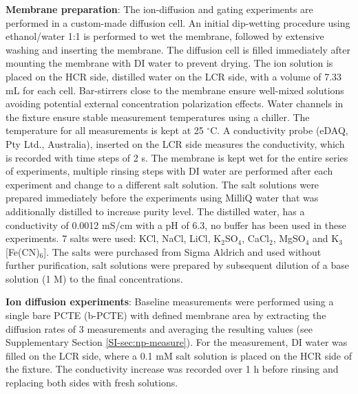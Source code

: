 \vspace{1em}
\noindent
\textbf{Membrane preparation}: The ion-diffusion and gating experiments are
performed in a custom-made diffusion cell. An initial dip-wetting
procedure using ethanol/water 1:1 is performed to wet the membrane,
followed by extensive washing and inserting the membrane. The
diffusion cell is filled immediately after mounting the membrane with
DI water to prevent drying. The ion solution is placed on the HCR
side, distilled water on the LCR side, with a volume of 7.33 mL for
each cell. Bar-stirrers close to the membrane ensure well-mixed
solutions avoiding potential external concentration polarization
effects. Water channels in the fixture ensure stable measurement
temperatures using a chiller. The temperature for all measurements is
kept at 25 $^{\circ}$C. A conductivity probe (eDAQ, Pty Ltd.,
Australia), inserted on the LCR side measures the conductivity, which
is recorded with time steps of 2 s. The membrane is kept wet for the
entire series of experiments, multiple rinsing steps with DI water are
performed after each experiment and change to a different salt
solution. The salt solutions were prepared immediately before the
experiments using MilliQ water that was additionally distilled to
increase purity level. The distilled water, has a conductivity of
0.0012 mS/cm with a pH of 6.3, no buffer has been used in these
experiments. 7 salts were used: KCl, NaCl, LiCl, K$_{2}$SO$_{4}$,
CaCl$_{2}$, MgSO$_{4}$ and K$_{3}$[Fe(CN)$_{6}$]. The salts were
purchased from Sigma Aldrich and used without further purification,
salt solutions were prepared by subsequent dilution of a base solution
(1 M) to the final concentrations.

\vspace{1em}
\noindent
\textbf{Ion diffusion experiments}: { Baseline measurements were
performed using a single bare PCTE (b-PCTE) with defined membrane area} by extracting the diffusion rates
of 3 measurements and averaging the resulting values (see
Supplementary Section \autoref{SI-sec:np-measure}). For the measurement, DI water was filled on
the LCR side, where a 0.1 mM salt solution is placed on the HCR side
of the fixture. The conductivity increase was recorded over 1 h before
rinsing and replacing both sides with fresh solutions.

